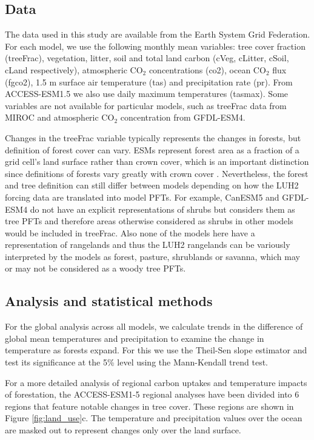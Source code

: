 \documentclass[draft]{agujournal2019}
\begin{document}
\subsection{Data}

The data used in this study are available from the Earth System Grid Federation.
For each model, we use the following monthly mean variables: tree cover fraction (treeFrac), vegetation, litter, soil and total land carbon (cVeg, cLitter, cSoil, cLand respectively), atmospheric CO$_2$ concentrations (co2), ocean CO$_2$ flux (fgco2), 1.5 m surface air temperature (tas) and precipitation rate (pr).
From ACCESS-ESM1.5 we also use daily maximum temperatures (tasmax).
Some variables are not available for particular models, such as treeFrac data from MIROC and atmospheric CO$_2$ concentration from GFDL-ESM4.

Changes in the treeFrac variable typically represents the changes in forests, but definition of forest cover can vary.
ESMs represent forest area as a fraction of a grid cell's land surface rather than crown cover, which is an important distinction since definitions of forests vary greatly with crown cover \cite{zomer_land_2008}.
Nevertheless, the forest and tree definition can still differ between models depending on how the LUH2 forcing data are translated into model PFTs.
For example, CanESM5 and GFDL-ESM4 do not have an explicit representations of shrubs but considers them as tree PFTs and therefore areas otherwise considered as shrubs in other models would be included in treeFrac.
Also none of the models here have a representation of rangelands and thus the LUH2 rangelands can be variously interpreted by the models as forest, pasture, shrublands or savanna, which may or may not be considered as a woody tree PFTs.

\subsection{Analysis and statistical methods}

For the global analysis across all models, we calculate trends in the difference of global mean temperatures and precipitation to examine the change in temperature as forests expand.
For this we use the Theil-Sen slope estimator and test its significance at the 5\% level using the Mann-Kendall trend test.

For a more detailed analysis of regional carbon uptakes and temperature impacts of forestation, the ACCESS-ESM1-5 regional analyses have been divided into 6 regions that feature notable changes in tree cover.
These regions are shown in Figure \ref{fig:land_use}c.
The temperature and precipitation values over the ocean are masked out to represent changes only over the land surface.
\end{document}

